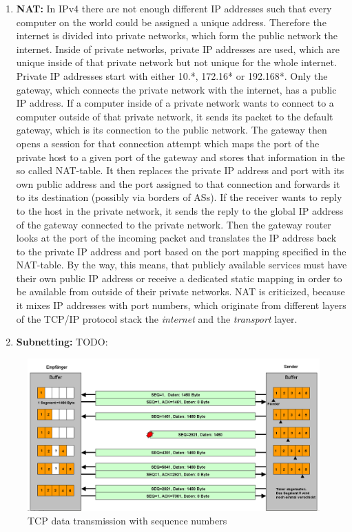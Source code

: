 \begin{enumerate}
      \item \textbf{\acf{NAT}:} In \ac{IP}v4 there are not enough different IP addresses such that every computer on the world could be assigned a unique address. Therefore the internet is divided into private networks, which form the public network \textendash{} the internet. Inside of private networks, private IP addresses are used, which are unique inside of that private network but not unique for the whole internet. Private IP addresses start with either 10.*, 172.16* or 192.168*. Only the gateway, which connects the private network with the internet, has a public IP address. If a computer inside of a private network wants to connect to a computer outside of that private network, it sends its packet to the default gateway, which is its connection to the public network. The gateway then opens a session for that connection attempt which maps the port of the private host to a given port of the gateway and stores that information in the so called \ac{NAT}-table. It then replaces the private IP address and port with its own public address and the port assigned to that connection and forwards it to its destination (possibly via borders of \acl{AS}s). If the receiver wants to reply to the host in the private network, it sends the reply to the global IP address of the gateway connected to the private network. Then the gateway router looks at the port of the incoming packet and translates the IP address back to the private IP address and port based on the port mapping specified in the \ac{NAT}-table. By the way, this means, that publicly available services must have their own public IP address or receive a dedicated static mapping in order to be available from outside of their private networks. \ac{NAT} is criticized, because it mixes IP addresses with port numbers, which originate from different layers of the \ac{TCP}/\ac{IP} protocol stack \textendash{} the \textit{internet} and the \textit{transport} layer.
      \item \textbf{Subnetting:} TODO:
\end{enumerate}

\begin{figure}[h]
      \centering
      \includegraphics[width=\textwidth]{gfx/Tcp_transfer.png}
      \caption{TCP data transmission with sequence numbers}
      \label{fig:tcp_data_transmission}
\end{figure}